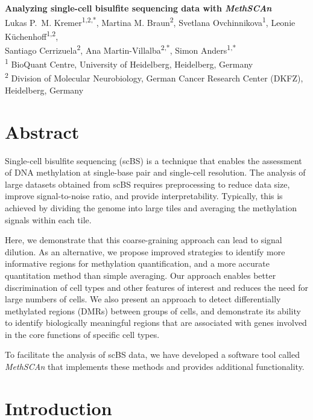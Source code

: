 \documentclass[10pt]{article}
\begin{document}
{\centering{}
\textbf{\Large Analyzing single-cell bisulfite sequencing data with \textit{MethSCAn}}\\[1.5ex]

Lukas P.~M. Kremer\textsuperscript{1,2,*},
Martina M. Braun\textsuperscript{2},
Svetlana Ovchinnikova\textsuperscript{1},
Leonie Küchenhoff\textsuperscript{1,2},\\
Santiago Cerrizuela\textsuperscript{2},
Ana Martin-Villalba\textsuperscript{2,*},
Simon Anders\textsuperscript{1,*}\\[1ex]
{\footnotesize
\textsuperscript{1} BioQuant Centre, University of Heidelberg, Heidelberg, Germany\\[-.5ex] 
\textsuperscript{2} Division of Molecular Neurobiology, German Cancer Research Center (DKFZ), Heidelberg, Germany}
}
\vspace{4.5ex}

\section*{Abstract}

\noindent Single-cell bisulfite sequencing (scBS) is a technique that enables the assessment of DNA methylation at single-base pair and single-cell resolution.
The analysis of large datasets obtained from scBS requires preprocessing to reduce data size, improve signal-to-noise ratio, and provide interpretability.
Typically, this is achieved by dividing the genome into large tiles and averaging the methylation signals within each tile.

Here, we demonstrate that this coarse-graining approach can lead to signal dilution.
As an alternative, we propose improved strategies to identify more informative regions for methylation quantification, and a more accurate quantitation method than simple averaging.
Our approach enables better discrimination of cell types and other features of interest and reduces the need for large numbers of cells.
We also present an approach to detect differentially methylated regions (DMRs) between groups of cells, and demonstrate its ability to identify biologically meaningful regions that are associated with genes involved in the core functions of specific cell types.

To facilitate the analysis of scBS data, we have developed a software tool called \textit{MethSCAn} that implements these methods and provides additional functionality.

\section*{Introduction}
\end{document}
